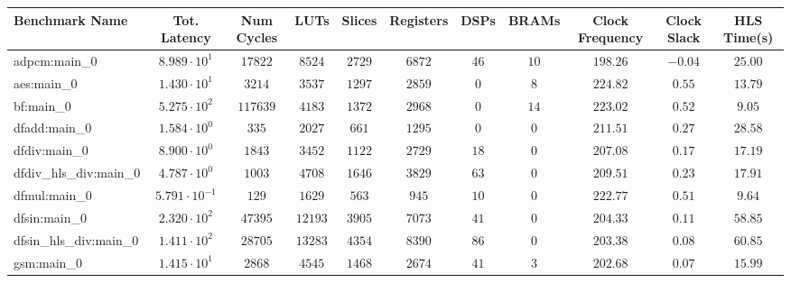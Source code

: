 \begin{tabular}{|l|c|c|c|c|c|c|c|c|c|c|}
\hline
Benchmark Name          & Tot. Latency            & Num Cycles & LUTs      & Slices    & Registers & DSPs    & BRAMs   & Clock Frequency & Clock Slack & HLS Time(s) \\
\hline
adpcm:main\_0           & $ 8.989 \cdot 10^{1}  $ & $ 17822  $ & $ 8524  $ & $ 2729  $ & $ 6872  $ & $ 46  $ & $ 10  $ & $ 198.26      $ & $ -0.04   $ & $ 25.00   $ \\
aes:main\_0             & $ 1.430 \cdot 10^{1}  $ & $ 3214   $ & $ 3537  $ & $ 1297  $ & $ 2859  $ & $ 0   $ & $ 8   $ & $ 224.82      $ & $ 0.55    $ & $ 13.79   $ \\
bf:main\_0              & $ 5.275 \cdot 10^{2}  $ & $ 117639 $ & $ 4183  $ & $ 1372  $ & $ 2968  $ & $ 0   $ & $ 14  $ & $ 223.02      $ & $ 0.52    $ & $ 9.05    $ \\
dfadd:main\_0           & $ 1.584 \cdot 10^{0}  $ & $ 335    $ & $ 2027  $ & $ 661   $ & $ 1295  $ & $ 0   $ & $ 0   $ & $ 211.51      $ & $ 0.27    $ & $ 28.58   $ \\
dfdiv:main\_0           & $ 8.900 \cdot 10^{0}  $ & $ 1843   $ & $ 3452  $ & $ 1122  $ & $ 2729  $ & $ 18  $ & $ 0   $ & $ 207.08      $ & $ 0.17    $ & $ 17.19   $ \\
dfdiv\_hls\_div:main\_0 & $ 4.787 \cdot 10^{0}  $ & $ 1003   $ & $ 4708  $ & $ 1646  $ & $ 3829  $ & $ 63  $ & $ 0   $ & $ 209.51      $ & $ 0.23    $ & $ 17.91   $ \\
dfmul:main\_0           & $ 5.791 \cdot 10^{-1} $ & $ 129    $ & $ 1629  $ & $ 563   $ & $ 945   $ & $ 10  $ & $ 0   $ & $ 222.77      $ & $ 0.51    $ & $ 9.64    $ \\
dfsin:main\_0           & $ 2.320 \cdot 10^{2}  $ & $ 47395  $ & $ 12193 $ & $ 3905  $ & $ 7073  $ & $ 41  $ & $ 0   $ & $ 204.33      $ & $ 0.11    $ & $ 58.85   $ \\
dfsin\_hls\_div:main\_0 & $ 1.411 \cdot 10^{2}  $ & $ 28705  $ & $ 13283 $ & $ 4354  $ & $ 8390  $ & $ 86  $ & $ 0   $ & $ 203.38      $ & $ 0.08    $ & $ 60.85   $ \\
gsm:main\_0             & $ 1.415 \cdot 10^{1}  $ & $ 2868   $ & $ 4545  $ & $ 1468  $ & $ 2674  $ & $ 41  $ & $ 3   $ & $ 202.68      $ & $ 0.07    $ & $ 15.99   $ \\

\end{tabular}
